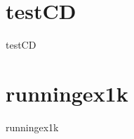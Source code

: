 \section{testCD}
\label{datasets:testCD}
\begin{datasetDescription}{testCD}
\end{datasetDescription}

\section{runningex1k}
\label{datasets:runningex1k}
\begin{datasetDescription}{runningex1k}
\end{datasetDescription}

